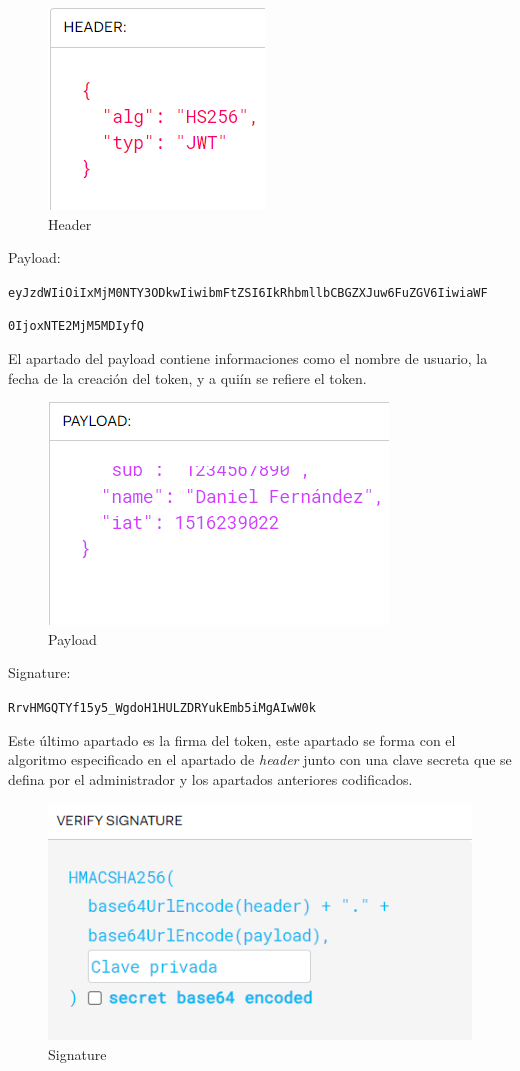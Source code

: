 \begin{figure}[htbp]
    \centering
    \includegraphics[width=0.5\linewidth]{Imagenes/HeaderJWT.png}
    \caption{Header}
    \label{Header}
\end{figure}
\FloatBarrier

Payload:

\texttt{eyJzdWIiOiIxMjM0NTY3ODkwIiwibmFtZSI6IkRhbmllbCBGZXJuw6FuZGV6IiwiaWF}

\texttt{0IjoxNTE2MjM5MDIyfQ}

El apartado del payload contiene informaciones como el nombre de usuario, la fecha de la creación del token, y a quiín se refiere el token.

\begin{figure}[htbp]
    \centering
    \includegraphics[width=0.5\linewidth]{Imagenes/JWT Payload.png}
    \caption{Payload}
    \label{Payload}
\end{figure}
\FloatBarrier

Signature:

\texttt{RrvHMGQTYf15y5\_WgdoH1HULZDRYukEmb5iMgAIwW0k}

Este último apartado es la firma del token, este apartado se forma con el algoritmo especificado en el apartado de \textit{header} junto con una clave secreta que se defina por el administrador y los apartados anteriores codificados.

\begin{figure}[htbp]
    \centering
    \includegraphics[width=0.5\linewidth]{Imagenes/JWTFirma.png}
    \caption{Signature}
    \label{Signature}
\end{figure}
\FloatBarrier

